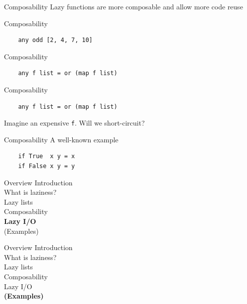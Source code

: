 \documentclass[20pt]{beamer}
\newcommand{\vspaced}{
    \vspace{5mm}
}
\begin{document}
\begin{frame}{Composability}
    Lazy functions are more composable and allow more code reuse
\end{frame}

\begin{frame}[fragile]{Composability}
    \begin{lstlisting}
    any odd [2, 4, 7, 10]
    \end{lstlisting}
\end{frame}

\begin{frame}[fragile]{Composability}
    \begin{lstlisting}
    any f list = or (map f list)
    \end{lstlisting}
\end{frame}

\begin{frame}[fragile]{Composability}
    \begin{lstlisting}
    any f list = or (map f list)
    \end{lstlisting}
    \vspaced
    Imagine an expensive \texttt{f}. Will we short-circuit?
\end{frame}

\begin{frame}[fragile]{Composability}
    A well-known example
    \vspaced
    \begin{lstlisting}
    if True  x y = x
    if False x y = y
    \end{lstlisting}
\end{frame}


\begin{frame}{Overview}
    Introduction \\
    What is laziness? \\
    Lazy lists \\
    Composability \\
    \textbf{Lazy I/O} \\
    (Examples)
\end{frame}



\begin{frame}{Overview}
    Introduction \\
    What is laziness? \\
    Lazy lists \\
    Composability \\
    Lazy I/O \\
    \textbf{(Examples)}
\end{frame}
\end{document}
